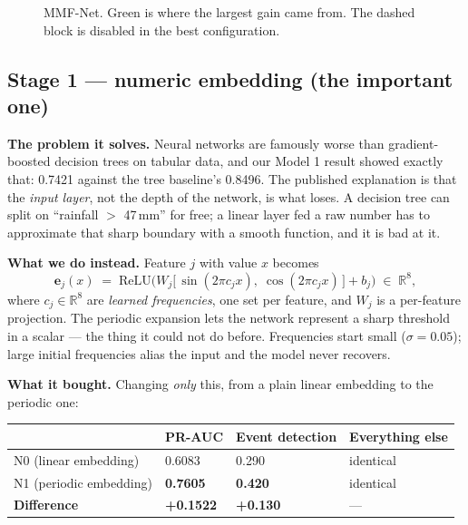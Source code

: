\documentclass[11pt,a4paper]{article}
\newcommand{\good}[1]{\textcolor{green!45!black}{\textbf{#1}}}
\begin{document}
\begin{figure}[h]
\caption{MMF-Net. Green is where the largest gain came from. The dashed block is
disabled in the best configuration.}
\end{figure}

\subsection{Stage 1 --- numeric embedding (the important one)}

\textbf{The problem it solves.} Neural networks are famously worse than
gradient-boosted decision trees on tabular data, and our Model 1 result showed
exactly that: 0.7421 against the tree baseline's 0.8496. The published
explanation is that the \emph{input layer}, not the depth of the network, is
what loses. A decision tree can split on ``rainfall $>$ 47\,mm'' for free; a
linear layer fed a raw number has to approximate that sharp boundary with a
smooth function, and it is bad at it.

\textbf{What we do instead.} Feature $j$ with value $x$ becomes
\[
  \mathbf{e}_j(x) \;=\; \mathrm{ReLU}\!\Big(
     W_j \big[\, \sin(2\pi c_j x),\; \cos(2\pi c_j x) \,\big] + b_j \Big)
     \;\in\; \mathbb{R}^{8},
\]
where $c_j \in \mathbb{R}^{8}$ are \emph{learned frequencies}, one set per
feature, and $W_j$ is a per-feature projection. The periodic expansion lets the
network represent a sharp threshold in a scalar --- the thing it could not do
before. Frequencies start small ($\sigma = 0.05$); large initial frequencies
alias the input and the model never recovers.

\textbf{What it bought.} Changing \emph{only} this, from a plain linear
embedding to the periodic one:

\begin{center}
\small
\begin{tabular}{@{}llll@{}}
\toprule
& \textbf{PR-AUC} & \textbf{Event detection} & \textbf{Everything else} \\
\midrule
N0 (linear embedding)  & 0.6083 & 0.290 & identical \\
N1 (periodic embedding) & \good{0.7605} & \good{0.420} & identical \\
\midrule
\textbf{Difference} & \textbf{+0.1522} & \textbf{+0.130} & --- \\
\bottomrule
\end{tabular}
\end{center}
\end{document}
